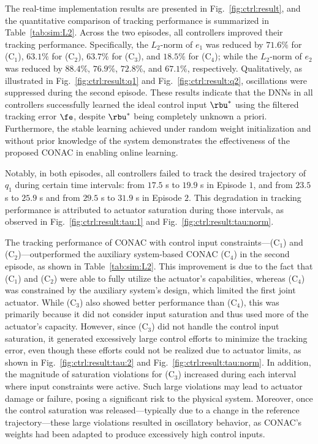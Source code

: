 \documentclass[journal]{IEEEtran}
\begin{document}
The real-time implementation results are presented in Fig.~\ref{fig:ctrl:result}, and the quantitative comparison of tracking performance is summarized in Table~\ref{tab:sim:L2}.
Across the two episodes, all controllers improved their tracking performance. 
Specifically, the $L_2$-norm of $e_1$ was reduced by $71.6 \%$ for (C$_1$), $63.1 \%$ for (C$_2$), $63.7 \%$ for (C$_3$), and $18.5 \%$ for (C$_4$); while the $L_2$-norm of $e_2$ was reduced by $88.4 \%$, $76.9 \%$, $72.8 \%$, and $67.1 \%$, respectively.
Qualitatively, as illustrated in Fig.~\ref{fig:ctrl:result:q1} and Fig.~\ref{fig:ctrl:result:q2}, oscillations were suppressed during the second episode.
These results indicate that the DNNs in all controllers successfully learned the ideal control input $\rbu^*$ using the filtered tracking error $\fe$, despite $\rbu^*$ being completely unknown a priori.
Furthermore, the stable learning achieved under random weight initialization and without prior knowledge of the system demonstrates the effectiveness of the proposed CONAC in enabling online learning.

Notably, in both episodes, all controllers failed to track the desired trajectory of $q_1$ during certain time intervals: from $17.5$ s to $19.9$ s in Episode $1$, and from $23.5$ s to $25.9$ s and from $29.5$ s to $31.9$ s in Episode $2$.
This degradation in tracking performance is attributed to actuator saturation during those intervals, as observed in Fig.~\ref{fig:ctrl:result:tau:1} and Fig.~\ref{fig:ctrl:result:tau:norm}.

The tracking performance of CONAC with control input constraints—\ie (C$_1$) and (C$_2$)—outperformed the auxiliary system-based CONAC (C$_4$) in the second episode, as shown in Table~\ref{tab:sim:L2}.
This improvement is due to the fact that (C$_1$) and (C$_2$) were able to fully utilize the actuator's capabilities, whereas (C$_4$) was constrained by the auxiliary system's design, which limited the first joint actuator.
While (C$_3$) also showed better performance than (C$_4$), this was primarily because it did not consider input saturation and thus used more of the actuator's capacity.
However, since (C$_3$) did not handle the control input saturation, it generated excessively large control efforts to minimize the tracking error, even though these efforts could not be realized due to actuator limits, as shown in Fig.~\ref{fig:ctrl:result:tau:2} and Fig.~\ref{fig:ctrl:result:tau:norm}.
In addition, the magnitude of saturation violations for (C$_3$) increased during each interval where input constraints were active.
Such large violations may lead to actuator damage or failure, posing a significant risk to the physical system.
Moreover, once the control saturation was released—typically due to a change in the reference trajectory—these large violations resulted in oscillatory behavior, as CONAC's weights had been adapted to produce excessively high control inputs.
\end{document}
